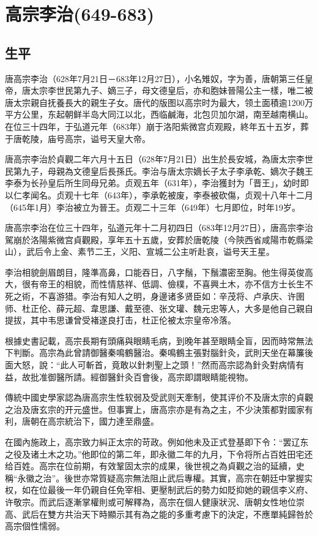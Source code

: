 
\section{高宗李治\tiny(649-683)}

\subsection{生平}

唐高宗李治（628年7月21日－683年12月27日），小名雉奴，字为善，唐朝第三任皇帝，唐太宗李世民第九子、嫡三子，母文德皇后，亦和胞妹晉陽公主一樣，唯二被唐太宗親自抚養長大的親生子女。唐代的版图以高宗时为最大，领土面積逾1200万平方公里，东起朝鲜半岛大同江以北，西临鹹海，北包贝加尔湖，南至越南横山。在位三十四年，于弘道元年（683年）崩于洛阳紫微宫贞观殿，終年五十五岁，葬于唐乾陵，庙号高宗，谥号天皇大帝。

唐高宗李治於貞觀二年六月十五日（628年7月21日）出生於長安城，為唐太宗李世民第九子，母親為文德皇后長孫氏。李治与唐太宗嫡长子太子李承乾、嫡次子魏王李泰为长孙皇后所生同母兄弟。贞观五年（631年），李治獲封为「晋王」，幼时即以仁孝闻名。贞观十七年（643年），李承乾被废，李泰被砍傷，贞观十八年十二月（645年1月）李治被立为晉王。贞观二十三年（649年）七月即位，时年19岁。

唐高宗李治在位三十四年，弘道元年十二月初四日（683年12月27日），唐高宗李治駕崩於洛陽紫微宫貞觀殿，享年五十五歲，安葬於唐乾陵（今陝西省咸陽市乾縣梁山），武后令上金、素节二王，义阳、宣城二公主听赴哀，谥号天王星。

李治相貌劍眉朗目，隆準高鼻，口能吞日，八字鬚，下鬚濃密至胸。他生得英俊高大，很有帝王的相貌，而性情慈祥、低調、儉樸，不喜興土木，亦不信方士长生不死之術，不喜游猎。李治有知人之明，身邊诸多贤臣如：辛茂将、卢承庆、许圉师、杜正伦、薛元超、韋思謙、戴至德、张文瓘、魏元忠等人，大多是他自己親自提拔，其中韦思谦曾受褚遂良打击，杜正伦被太宗皇帝冷落。

根據史書記載，高宗長期有頭痛與眼睛毛病，到晚年甚至眼睛全盲，因而時常無法下判斷。高宗為此曾請御醫秦鳴鶴醫治。秦鳴鶴主張對腦針灸，武則天坐在幕簾後面大怒，說：“此人可斬首，竟敢以針刺聖上之頭！”然而高宗認為針灸對病情有益，故批准御醫所請。經御醫針灸百會後，高宗即謂眼睛能視物。

傳統中國史學家認為唐高宗生性软弱及受武则天牽制，使其评价不及唐太宗的貞觀之治及唐玄宗的开元盛世。但事實上，唐高宗亦是有為之主，不少決策都對國家有利，唐朝在高宗統治下，國力達至鼎盛。

在國內施政上，高宗致力糾正太宗的苛政。例如他未及正式登基即下令：“罢辽东之役及诸土木之功。”他即位的第二年，即永徽二年的九月，下令将所占百姓田宅还给百姓。高宗在位前期，有效鞏固太宗的成果，後世視之為貞觀之治的延續，史稱“永徽之治”。後世亦常質疑高宗無法阻止武后專權。其實，高宗在朝廷中掌握实权，如在位最後一年仍親自任免宰相、更壓制武后的勢力如貶抑她的親信李义府、许敬宗。而武后逐漸掌權則或可解釋為，高宗在個人健康狀況、唐朝女性地位崇高、武后在雙方共治天下時顯示其有為之能的多重考慮下的決定，不應單純歸咎於高宗個性懦弱。

